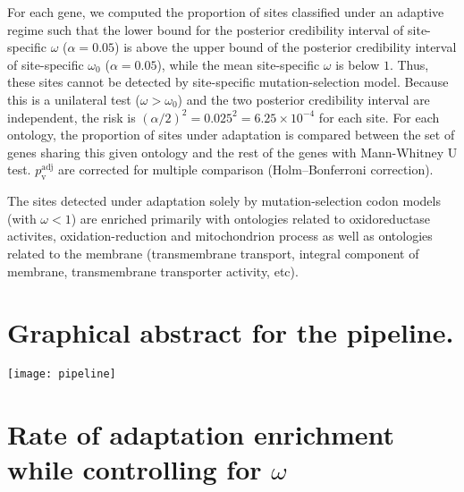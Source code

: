 \documentclass{article}
\renewcommand*{\bm}[1]{#1}%
\begin{document}
    For each gene, we computed the proportion of sites classified under an adaptive regime such that the lower bound for the posterior credibility interval of site-specific $\omega$ ($\alpha=0.05$) is above the upper bound of the posterior credibility interval of site-specific $\omega_{0}$ ($\alpha=0.05$), while the mean site-specific $\omega$ is below $1$.
    Thus, these sites cannot be detected by site-specific mutation-selection model.
    Because this is a unilateral test ($\omega > \omega_{0}$) and the two posterior credibility interval are independent, the risk is $(\alpha/2)^2=0.025^2=6.25 \times 10^{-4}$ for each site.
    For each ontology, the proportion of sites under adaptation is compared between the set of genes sharing this given ontology and the rest of the genes with Mann-Whitney U test.
    $p_{\mathrm{v}}^{\mathrm{adj}}$ are corrected for multiple comparison (Holm–Bonferroni correction).

    \begin{center}
        \footnotesize
        
    \end{center}

    The sites detected under adaptation solely by mutation-selection codon models (with $\omega < 1$) are enriched primarily with ontologies related to oxidoreductase activites, oxidation-reduction and mitochondrion process as well as ontologies related to the membrane (transmembrane transport, integral component of membrane, transmembrane transporter activity, etc).

    \pagebreak


    \section{Graphical abstract for the pipeline.}
    \label{subsec:method-summary}

    \begin{center}
        \texttt{[image: pipeline]}
    \end{center}

    \pagebreak


    \section{Rate of adaptation enrichment while controlling for $\bm{\omega}$}
    \label{sec:controlling-for-omega}
\end{document}
